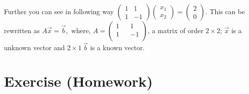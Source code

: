 \documentclass{article}
\begin{document}
Further you can see in following way \(\begin{pmatrix}
                            1 & 1\\ 
                            1 & -1 
                     \end{pmatrix} \begin{pmatrix}
                            x_1\\
                            x_2
                    \end{pmatrix} = \begin{pmatrix}
                                2\\
                                0
                    \end{pmatrix}\). This can be rewritten as \(A\vec{x} = \vec{b},\text{ where, }A = \begin{pmatrix}
                            1 && 1\\
                            1 && -1\\
                        \end{pmatrix}\), a matrix of order $2\times 2$; $\vec{x}$ is a unknown vector and $2\times1~\vec{b}$ is a known vector.




\section{Exercise (Homework)}
\end{document}
